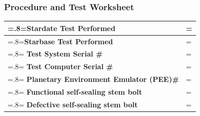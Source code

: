 \documentclass[a4paper,12pt]{article}
\theoremstyle{definition}
\def\arraystretch{1.5}%
\begin{document}
\subsubsection{Procedure and Test Worksheet}

\bgroup
\def\arraystretch{1.5}%
\begin{tabularx}{\textwidth}{|>{\hsize=.8\hsize\linewidth=\hsize}X|>{\hsize=1.2\hsize\linewidth=\hsize}X|}
	\hline
	\textbf{Stardate Test Performed}                & \\ \hline
	\textbf{Starbase Test Performed}                & \\ \hline
	\textbf{Test System Serial \#}                  & \\ \hline
	\textbf{Test Computer Serial \#}                & \\ \hline
	\textbf{Planetary Environment Emulator (PEE)\#} & \\ \hline
	\textbf{Functional self-sealing stem bolt}      & \\ \hline
	\textbf{Defective self-sealing stem bolt}       & \\ \hline
\end{tabularx}
\egroup




\bgroup
\end{document}
